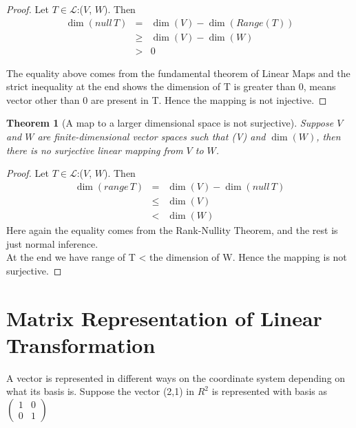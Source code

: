 \documentclass[a4paper,12pt,reqno,oneside]{amsart}
\newtheorem{theorem}{Theorem}
\theoremstyle{plain}
\numberwithin{equation}{section}
\begin{document}
\begin{proof}[Proof]
	Let $T\in\mathcal{L}$:($V$, $W$). Then
	\begin{eqnarray*}
	\dim(null\,T)&=&\dim(V) - \dim(Range (T)) \\
	& \geq & \dim(V) - \dim(W) \\
	& > & 0
	\end{eqnarray*}
	
	The equality above comes from the fundamental theorem of Linear Maps and the strict inequality at the end shows the dimension of T is greater than 0, means vector other than 0 are present in T. Hence the mapping is not injective.
\end{proof}

\begin{theorem}[A map to a larger dimensional space is not surjective]
Suppose $V$ and $W$ are finite-dimensional vector spaces such that \dim(V) and
	\ltr $\dim(W)$, then there is no surjective linear mapping from $V$ to $W$.
\end{theorem}
\begin{proof}[Proof]
	Let $T\in\mathcal{L}$:($V$, $W$). Then
	\begin{eqnarray*}
	\dim(range\,T)&=&\dim(V) - \dim(null\,T) \\
	& \leq & \dim(V) \\
	& < & \dim(W)
	\end{eqnarray*}
	Here again the equality comes from the Rank-Nullity Theorem, and the rest is just normal inference.\\
	At the end we have range of T < the dimension of W. Hence the mapping is not surjective.
\end{proof}
\section{Matrix Representation of Linear Transformation}
A vector is represented in different ways on the coordinate system depending on what its basis is. Suppose the vector (2,1) in $R^2$ is represented with basis as 
$\begin{pmatrix}
    1 & 0\\
    0 & 1
\end{pmatrix}$
\end{document}
